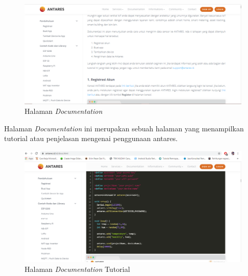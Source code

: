 \begin{enumerate}
    \begin{figure}[H]
    \centering
    \includegraphics[width=1\textwidth]{figures/antares10.png}
    \caption{Halaman \textit{Documentation}}
    \label{print}
    \end{figure}
    \par Halaman \textit{Documentation} ini merupakan sebuah halaman yang menampilkan tutorial atau penjelasan mengenai penggunaan antares.
    \begin{figure}[H]
    \centering
    \includegraphics[width=1\textwidth]{figures/antares11.png}
    \caption{Halaman \textit{Documentation} Tutorial}
    \label{print}
    \end{figure}
    

\end{enumerate}
